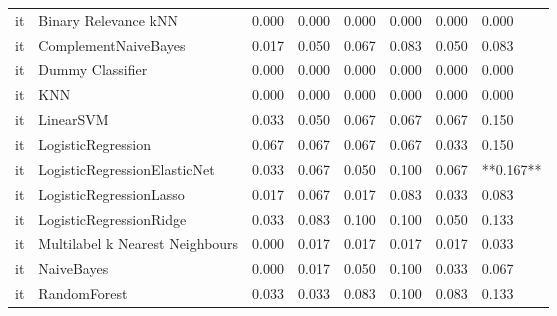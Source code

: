 \begin{tabular}{llllllll}
      it &            Binary Relevance kNN &     0.000 &                     0.000 &                 0.000 &                  0.000 &                                   0.000 &     0.000 \\
      it &            ComplementNaiveBayes &     0.017 &                     0.050 &                 0.067 &                  0.083 &                                   0.050 &     0.083 \\
      it &                Dummy Classifier &     0.000 &                     0.000 &                 0.000 &                  0.000 &                                   0.000 &     0.000 \\
      it &                             KNN &     0.000 &                     0.000 &                 0.000 &                  0.000 &                                   0.000 &     0.000 \\
      it &                       LinearSVM &     0.033 &                     0.050 &                 0.067 &                  0.067 &                                   0.067 &     0.150 \\
      it &              LogisticRegression &     0.067 &                     0.067 &                 0.067 &                  0.067 &                                   0.033 &     0.150 \\
      it &    LogisticRegressionElasticNet &     0.033 &                     0.067 &                 0.050 &                  0.100 &                                   0.067 & **0.167** \\
      it &         LogisticRegressionLasso &     0.017 &                     0.067 &                 0.017 &                  0.083 &                                   0.033 &     0.083 \\
      it &         LogisticRegressionRidge &     0.033 &                     0.083 &                 0.100 &                  0.100 &                                   0.050 &     0.133 \\
      it & Multilabel k Nearest Neighbours &     0.000 &                     0.017 &                 0.017 &                  0.017 &                                   0.017 &     0.033 \\
      it &                      NaiveBayes &     0.000 &                     0.017 &                 0.050 &                  0.100 &                                   0.033 &     0.067 \\
      it &                    RandomForest &     0.033 &                     0.033 &                 0.083 &                  0.100 &                                   0.083 &     0.133 \\

\end{tabular}
